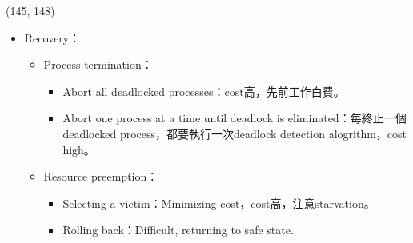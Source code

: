 \begin{theorem}{(145, 148)}
\begin{itemize}
        \item Recovery：\begin{itemize}
            \item Process termination：\begin{itemize}
                \item Abort all deadlocked processes：cost高，先前工作白費。
                \item Abort one process at a time until deadlock is eliminated：每終止一個deadlocked process，都要執行一次deadlock detection alogrithm，cost high。
            \end{itemize}
            \item Resource preemption：\begin{itemize}
                \item Selecting a victim：Minimizing cost，cost高，注意starvation。
                \item Rolling back：Difficult, returning to safe state.
            \end{itemize}
        \end{itemize}
    \end{itemize}
\end{theorem}
